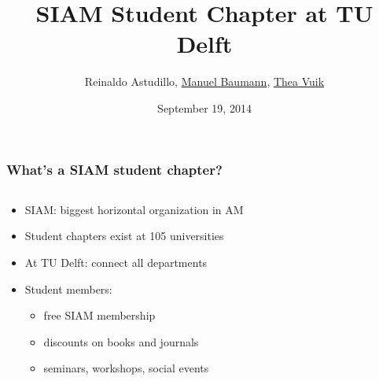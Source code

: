 \documentclass{beamer}
\title{\huge{SIAM Student Chapter at TU Delft}}
\author{Reinaldo Astudillo, \underline{Manuel Baumann}, \underline{Thea Vuik}}
\date{\footnotesize{September 19, 2014}}
\begin{document}
\frame{\titlepage}
\begin{frame}
\frametitle{What's a SIAM student chapter?}
\begin{columns}
 \begin{column}{0.8\textwidth}
 \begin{itemize}
  \item SIAM: biggest horizontal organization in AM

\bigskip
  \item Student chapters exist at 105 universities

\bigskip
  \item At TU Delft: connect all departments

\bigskip
  \item Student members: 
\begin{itemize}
 \item free SIAM membership
 \item discounts on books and journals
 \item seminars, workshops, social events
\end{itemize}
 \end{itemize}

 \end{column}


\end{columns}
\end{frame}
\end{document}
